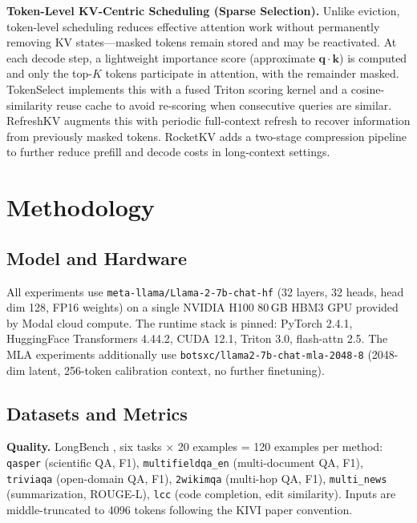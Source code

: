 \documentclass[conference]{IEEEtran}
\begin{document}
\textbf{Token-Level KV-Centric Scheduling (Sparse Selection).}
Unlike eviction, token-level scheduling reduces effective attention
work without permanently removing KV states---masked tokens remain
stored and may be reactivated.  At each decode step, a lightweight
importance score (approximate $\mathbf{q}\cdot\mathbf{k}$) is
computed and only the top-$K$ tokens participate in attention, with
the remainder masked.  TokenSelect \cite{tokenselect} implements this
with a fused Triton scoring kernel and a cosine-similarity reuse cache
to avoid re-scoring when consecutive queries are similar.  RefreshKV
\cite{refreshkv} augments this with periodic full-context refresh to
recover information from previously masked tokens.  RocketKV
\cite{rocketkv} adds a two-stage compression pipeline to further
reduce prefill and decode costs in long-context settings.

\section{Methodology}

\subsection{Model and Hardware}

All experiments use \texttt{meta-llama/Llama-2-7b-chat-hf} (32 layers,
32 heads, head dim 128, FP16 weights) on a single NVIDIA H100 80\,GB
HBM3 GPU provided by Modal cloud compute.  The runtime stack is pinned:
PyTorch 2.4.1, HuggingFace Transformers 4.44.2, CUDA 12.1, Triton 3.0,
flash-attn 2.5.  The MLA experiments additionally use
\texttt{botsxc/llama2-7b-chat-mla-2048-8} \cite{transmla} (2048-dim
latent, 256-token calibration context, no further finetuning).

\subsection{Datasets and Metrics}

\textbf{Quality.}  LongBench \cite{longbench}, six tasks $\times$ 20
examples = 120 examples per method: \texttt{qasper} (scientific QA, F1),
\texttt{multifieldqa\_en} (multi-document QA, F1), \texttt{triviaqa}
(open-domain QA, F1), \texttt{2wikimqa} (multi-hop QA, F1),
\texttt{multi\_news} (summarization, ROUGE-L), \texttt{lcc} (code
completion, edit similarity).  Inputs are middle-truncated to 4096
tokens following the KIVI paper convention.
\end{document}
